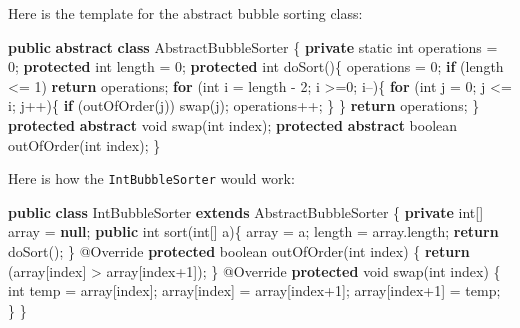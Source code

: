 \documentclass[]{article}
\newenvironment{Shaded}{}{}
\newcommand{\AttributeTok}[1]{\textcolor[rgb]{0.49,0.56,0.16}{#1}}
\newcommand{\DataTypeTok}[1]{\textcolor[rgb]{0.56,0.13,0.00}{#1}}
\newcommand{\DecValTok}[1]{\textcolor[rgb]{0.25,0.63,0.44}{#1}}
\newcommand{\FunctionTok}[1]{\textcolor[rgb]{0.02,0.16,0.49}{#1}}
\newcommand{\KeywordTok}[1]{\textcolor[rgb]{0.00,0.44,0.13}{\textbf{#1}}}
\newcommand{\NormalTok}[1]{#1}
\begin{document}
Here is the template for the abstract bubble sorting class:

\begin{Shaded}
\begin{Highlighting}[]
\KeywordTok{public} \KeywordTok{abstract} \KeywordTok{class}\NormalTok{ AbstractBubbleSorter \{}
    \KeywordTok{private} \DataTypeTok{static} \DataTypeTok{int}\NormalTok{ operations = }\DecValTok{0}\NormalTok{;}
    \KeywordTok{protected} \DataTypeTok{int}\NormalTok{ length = }\DecValTok{0}\NormalTok{;}
    \KeywordTok{protected} \DataTypeTok{int} \FunctionTok{doSort}\NormalTok{()\{}
\NormalTok{        operations = }\DecValTok{0}\NormalTok{;}
        \KeywordTok{if}\NormalTok{ (length <= }\DecValTok{1}\NormalTok{)}
            \KeywordTok{return}\NormalTok{ operations;}
        \KeywordTok{for}\NormalTok{ (}\DataTypeTok{int}\NormalTok{ i = length - }\DecValTok{2}\NormalTok{; i >=}\DecValTok{0}\NormalTok{; i--)\{}
            \KeywordTok{for}\NormalTok{ (}\DataTypeTok{int}\NormalTok{ j = }\DecValTok{0}\NormalTok{; j <= i; j++)\{}
                \KeywordTok{if}\NormalTok{ (}\FunctionTok{outOfOrder}\NormalTok{(j))}
                    \FunctionTok{swap}\NormalTok{(j);}
\NormalTok{                operations++;}
\NormalTok{            \}}
\NormalTok{        \}}
        \KeywordTok{return}\NormalTok{ operations;}
\NormalTok{    \}}
    \KeywordTok{protected} \KeywordTok{abstract} \DataTypeTok{void} \FunctionTok{swap}\NormalTok{(}\DataTypeTok{int}\NormalTok{ index);}
    \KeywordTok{protected} \KeywordTok{abstract} \DataTypeTok{boolean} \FunctionTok{outOfOrder}\NormalTok{(}\DataTypeTok{int}\NormalTok{ index);}
\NormalTok{\}}
\end{Highlighting}
\end{Shaded}

Here is how the \texttt{IntBubbleSorter} would work:

\begin{Shaded}
\begin{Highlighting}[]
\KeywordTok{public} \KeywordTok{class}\NormalTok{ IntBubbleSorter }\KeywordTok{extends}\NormalTok{ AbstractBubbleSorter \{}
    \KeywordTok{private} \DataTypeTok{int}\NormalTok{[] array = }\KeywordTok{null}\NormalTok{;}
    \KeywordTok{public} \DataTypeTok{int} \FunctionTok{sort}\NormalTok{(}\DataTypeTok{int}\NormalTok{[] a)\{}
\NormalTok{        array = a;}
\NormalTok{        length = array.}\FunctionTok{length}\NormalTok{;}
        \KeywordTok{return} \FunctionTok{doSort}\NormalTok{();}
\NormalTok{    \}}
    \AttributeTok{@Override}
    \KeywordTok{protected} \DataTypeTok{boolean} \FunctionTok{outOfOrder}\NormalTok{(}\DataTypeTok{int}\NormalTok{ index) \{}
        \KeywordTok{return}\NormalTok{ (array[index] > array[index+}\DecValTok{1}\NormalTok{]);}
\NormalTok{    \}}
    \AttributeTok{@Override}
    \KeywordTok{protected} \DataTypeTok{void} \FunctionTok{swap}\NormalTok{(}\DataTypeTok{int}\NormalTok{ index) \{}
        \DataTypeTok{int}\NormalTok{ temp = array[index];}
\NormalTok{        array[index] = array[index+}\DecValTok{1}\NormalTok{];}
\NormalTok{        array[index+}\DecValTok{1}\NormalTok{] = temp;}
\NormalTok{    \}}
\NormalTok{\}}
\end{Highlighting}
\end{Shaded}
\end{document}
